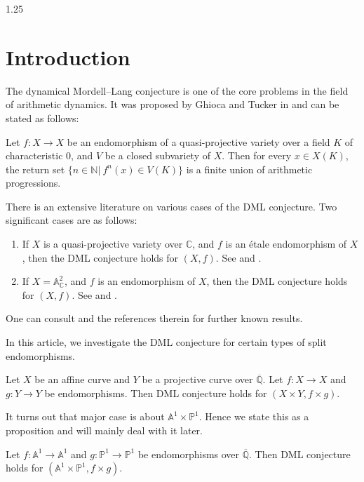 \documentclass[12pt]{amsart}
\begin{document}
\begin{spacing}{1.25}
\section{Introduction}\label{Sec_intro}

The dynamical Mordell--Lang conjecture is one of the core problems in the field of arithmetic dynamics. It was proposed by Ghioca and Tucker in \cite{GT09} and can be stated as follows:

\begin{DML}
    Let $f:X\to X$ be an endomorphism of a quasi-projective variety over a field $K$ of characteristic 0, and $V$ be a closed subvariety of $X$. Then for every $x\in X(K)$, the return set $\{ n\in \mathbb{N}|\  f^n(x) \in V(K)\}$ is a finite union of arithmetic progressions.
\end{DML}

There is an extensive literature on various cases of the DML conjecture. Two significant cases are as follows:

\begin{enumerate}
    \item If $X$ is a quasi-projective variety over $\mathbb{C}$, and $f$ is an \'etale endomorphism of $X$, then the DML conjecture holds for $(X,f)$. See \cite{Bel06} and \cite[Theorem 1.3]{BGT10}.
    \item If $X = \mathbb{A}^2_{\mathbb{C}}$, and $f$ is an endomorphism of $X$, then the DML conjecture holds for $(X,f)$. See \cite{Xie17} and \cite[Theorem 3.2]{Xie}.
\end{enumerate}

One can consult \cite{BGT16,Xie} and the references therein for further known results.

In this article, we investigate the DML conjecture for certain types of split endomorphisms.

\begin{theorem}\label{mainthm}
    Let $X$ be an affine curve and $Y$ be a projective curve over $\overline{\mathbb{Q}}$. Let $f:X\to X$ and $g:Y\to Y$ be endomorphisms. Then DML conjecture holds for $(X\times Y, f\times g)$.
\end{theorem}

It turns out that major case is about $\mathbb{A}^1\times\mathbb{P}^1$. Hence we state this as a proposition and will mainly deal with it later.

\begin{proposition}\label{mainprop}
    Let $f: \mathbb{A}^1 \to \mathbb{A}^1$ and $g: \mathbb{P}^1 \to \mathbb{P}^1$ be endomorphisms over $\overline{\mathbb{Q}}$. Then DML conjecture holds for $(\mathbb{A}^1 \times \mathbb{P}^1, f \times g)$.
\end{proposition}


\end{spacing}
\end{document}
